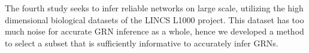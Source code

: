 \begin{abstracts}
The fourth study seeks to infer reliable networks on large scale, utilizing the high dimensional biological datasets of the LINCS L1000 project.  This dataset has too much noise for accurate GRN inference as a whole, hence we developed a method to select a  subset that is sufficiently informative to accurately infer GRNs. 




\end{abstracts}

